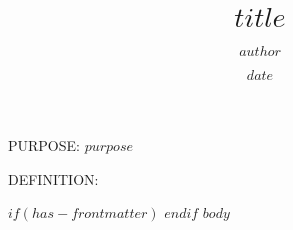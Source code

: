 \documentclass[12pt]{sog}
\title{$title$}
\date{$date$}
\author{$author$}
\begin{document}
\maketitle

%

\par PURPOSE: $purpose$

\par DEFINITION:

$if(has-frontmatter)$
\mainmatter
$endif$
$body$
\end{document}
